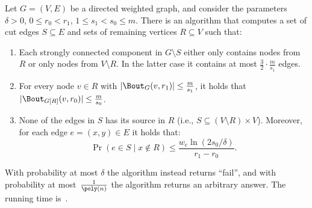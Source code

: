 \begin{lemma} \label{lem:cut-light}
Let $G = (V, E)$ be a directed weighted graph, and consider the parameters $\delta > 0$, $0 \leq r_0 < r_1$, $1 \leq s_1 < s_0 \leq m$. There is an algorithm that computes a set of cut edges $S \subseteq E$ and sets of remaining vertices $R \subseteq V$ such that:
\begin{enumerate}[label=(\roman*)]
    \item Each strongly connected component in $G \setminus S$ either only contains nodes from $R$ or only nodes from $V \setminus R$. In the latter case it contains at most $\frac32 \cdot \frac{m}{s_1}$ edges.
    \item For every node $v \in R$ with $|\Bout_G(v, r_1)| \leq \frac{m}{s_1}$, it holds that $|\Bout_{G[R]}(v, r_0)| \leq \frac{m}{s_0}$.
    \item None of the edges in $S$ has its source in $R$ (i.e., $S \subseteq (V \setminus R) \times V$). Moreover, for each edge $e = (x, y) \in E$ it holds that:
    \begin{equation*}
        \Pr(e \in S \mid x \not\in R) \leq \frac{w_e \ln(2s_0 / \delta)}{r_1 - r_0}.
    \end{equation*}
\end{enumerate}
With probability at most $\delta$ the algorithm instead returns ``fail'', and with probability at most~$\frac{1}{\poly(n)}$ the algorithm returns an arbitrary answer. The running time is~.
\end{lemma}


